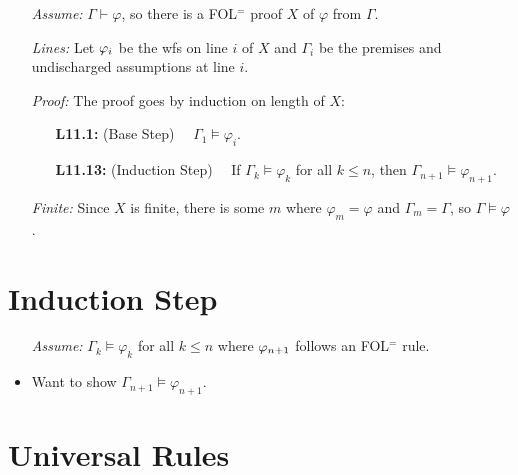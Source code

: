 \documentclass[a4paper, 11pt]{article} %
\begin{document}
\begin{enumerate}
  \item[\it Assume:] $\Gamma \vdash \varphi$, so there is a FOL$^=$ proof $X$ of $\varphi$ from $\Gamma$. 
  \item[\it Lines:] Let $\varphi_i$ be the wfs on line $i$ of $X$ and $\Gamma_i$ be the premises and undischarged assumptions at line $i$. 
  \item[\it Proof:] The proof goes by induction on length of $X$:
    \begin{itemize}
      \item[\bf L11.1:] (Base Step)~~ $\Gamma_1 \vDash \varphi_i$. 
      \item[\bf L11.13:] (Induction Step)~~ If $\Gamma_k \vDash \varphi_k$ for all $k\leq n$, then $\Gamma_{n+1} \vDash \varphi_{n+1}$. 
    \end{itemize}
  \item[\it Finite:] Since $X$ is finite, there is some $m$ where $\varphi_m=\varphi$ and $\Gamma_m=\Gamma$, so $\Gamma \vDash \varphi$.
\end{enumerate}




\section*{Induction Step}

\begin{itemize}
  \item[\it Assume:] $\Gamma_k \vDash \varphi_k$ for all $k\leq n$ where $\varphi_{n+1}$ follows an FOL$^=$ rule. 
  \item Want to show $\Gamma_{n+1}\vDash\varphi_{n+1}$.
\end{itemize}





\section*{Universal Rules}
\end{document}
